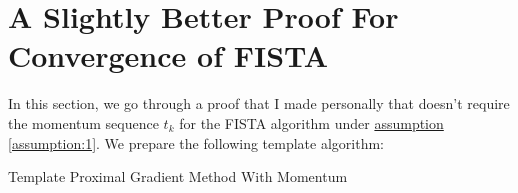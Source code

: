 \documentclass[]{article}
\theoremstyle{definition}
\begin{document}

\section{A Slightly Better Proof For Convergence of FISTA}\label{sec:fista1_proof}
    In this section, we go through a proof that I made personally that doesn't require the momentum sequence $t_k$ for the FISTA algorithm under \hyperref[assumption:1]{assumption \ref*{assumption:1}}. We prepare the following template algorithm: 
    \begin{algorithm}
        \begin{algorithmic}[1]
            \ENDFOR
        \end{algorithmic}
        \caption{Template Proximal Gradient Method With Momentum}\label{alg:fista_template}
    \end{algorithm}
\end{document}

